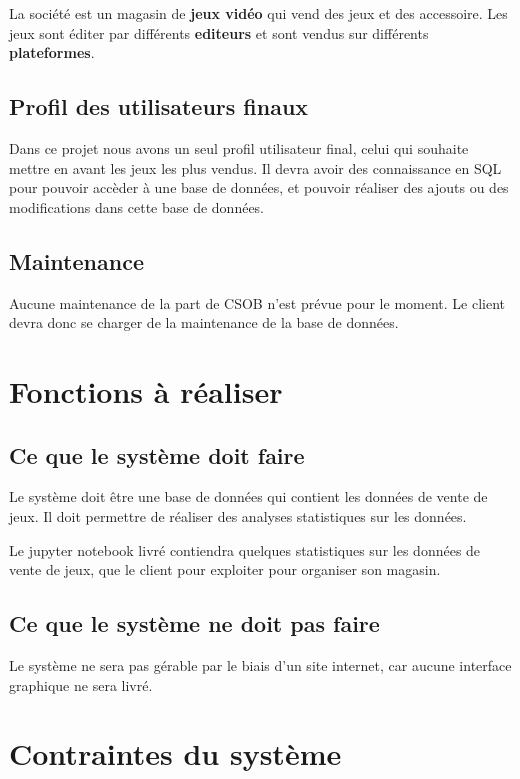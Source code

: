 \documentclass[french]{article}
\begin{document}
La société est un magasin de \textbf{jeux vidéo} qui vend des jeux et des accessoire. Les jeux sont éditer par différents \textbf{editeurs} et sont vendus sur différents \textbf{plateformes}.

\subsection{Profil des utilisateurs finaux}

Dans ce projet nous avons un seul profil utilisateur final, celui qui souhaite mettre en avant les jeux les plus vendus. Il devra avoir des connaissance en SQL pour pouvoir accèder à une base de données, et pouvoir réaliser des ajouts ou des modifications dans cette base de données.

\subsection{Maintenance}

Aucune maintenance de la part de CSOB n'est prévue pour le moment. Le client devra donc se charger de la maintenance de la base de données.

\section{Fonctions à réaliser}

\subsection{Ce que le système doit faire}

Le système doit être une base de données qui contient les données de vente de jeux. Il doit permettre de réaliser des analyses statistiques sur les données.

Le jupyter notebook livré contiendra quelques statistiques sur les données de vente de jeux, que le client pour exploiter pour organiser son magasin.

\subsection{Ce que le système ne doit pas faire}

Le système ne sera pas gérable par le biais d'un site internet, car aucune interface graphique ne sera livré.

\section{Contraintes du système}
\end{document}
